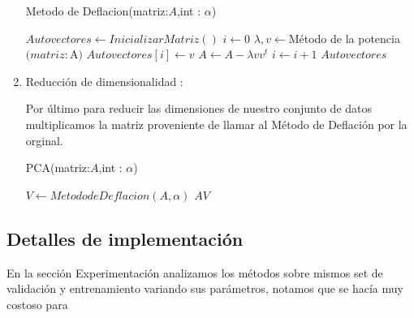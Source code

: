 \begin{enumerate}
\begin{algorithm}[H]
\caption{Metodo de Deflacion(matriz:$A$,int : $\alpha$)}
\begin{algorithmic}[H]
    \State $Autovectores \leftarrow InicializarMatriz()$
    \State $i \leftarrow 0$
        \State $\lambda,v \leftarrow $Método de la potencia$(matriz:$A$)$
        \State $Autovectores[i] \leftarrow v$
        \State $A \leftarrow A - \lambda vv^t$
        \State $i \leftarrow i +1$
    \EndWhile  
    \State
    \Return  $Autovectores$
\end{algorithmic}
\end{algorithm}

\item Reducción de dimensionalidad :

Por último para reducir las dimensiones de nuestro conjunto de datos multiplicamos la matriz proveniente de llamar al Método de Deflación por la orginal.
\begin{algorithm}[H]
\caption{PCA(matriz:$A$,int : $\alpha$)}
\begin{algorithmic}[H]
    \State $V  \leftarrow Metodo de Deflacion(A,\alpha)$
    \State
    \Return  $A V$
\end{algorithmic}
\end{algorithm}

\end{enumerate}





\subsection{Detalles de implementación }

En la sección Experimentación analizamos los métodos sobre mismos set de validación y entrenamiento variando sus parámetros, notamos que se hacía muy costoso para 









